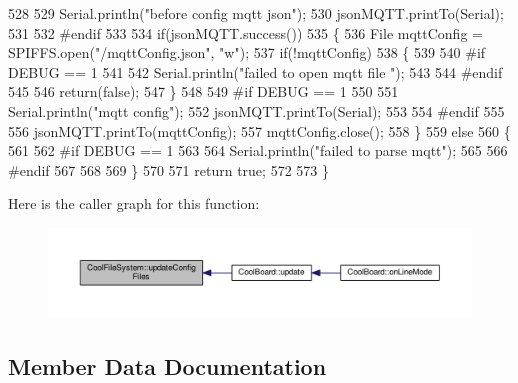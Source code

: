\begin{DoxyCode}
528 
529     Serial.println(\textcolor{stringliteral}{"before config mqtt json"});
530     jsonMQTT.printTo(Serial);
531 
532 \textcolor{preprocessor}{#endif}
533 
534     \textcolor{keywordflow}{if}(jsonMQTT.success())
535     \{
536         File mqttConfig = SPIFFS.open(\textcolor{stringliteral}{"/mqttConfig.json"}, \textcolor{stringliteral}{"w"}); 
537         \textcolor{keywordflow}{if}(!mqttConfig)
538         \{
539         
540 \textcolor{preprocessor}{        #if DEBUG == 1 }
541 
542             Serial.println(\textcolor{stringliteral}{"failed to open mqtt file "});
543         
544 \textcolor{preprocessor}{        #endif}
545         
546             \textcolor{keywordflow}{return}(\textcolor{keyword}{false});
547         \}
548 
549 \textcolor{preprocessor}{#if DEBUG == 1 }
550 
551         Serial.println(\textcolor{stringliteral}{"mqtt config"});
552         jsonMQTT.printTo(Serial);
553 
554 \textcolor{preprocessor}{#endif}
555     
556         jsonMQTT.printTo(mqttConfig);
557         mqttConfig.close();
558     \}
559     \textcolor{keywordflow}{else}
560     \{
561 
562 \textcolor{preprocessor}{    #if DEBUG == 1 }
563 
564         Serial.println(\textcolor{stringliteral}{"failed to parse mqtt"});
565     
566 \textcolor{preprocessor}{    #endif}
567 
568     
569     \}   
570         
571     \textcolor{keywordflow}{return} \textcolor{keyword}{true};
572 
573 \}   
\end{DoxyCode}
Here is the caller graph for this function\+:\nopagebreak
\begin{figure}[H]
\begin{center}
\leavevmode
\includegraphics[width=350pt]{classCoolFileSystem_a32dad79ae80182a83e2e8f52286b7c7b_icgraph}
\end{center}
\end{figure}


\subsection{Member Data Documentation}
\mbox{\label{classCoolFileSystem_ad398e0c5c41a0c88acdf5d672aa71351}} 
